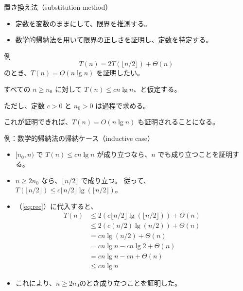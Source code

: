 \documentclass[unicode,11pt,aspectratio=169,notes]{beamer} %
\begin{document}
\begin{frame}{置き換え法（substitution method）}
  \begin{itemize}
    \item 定数を変数のままにして、限界を推測する。
    \item 数学的帰納法を用いて限界の正しさを証明し、定数を特定する。
  \end{itemize}
\end{frame}

\begin{frame}{例}
  \begin{equation}\label{eq:rec}
    T(n)=2T(\lfloor n/2\rfloor)+\Theta(n)
  \end{equation}
  のとき、$T(n)=O(n\lg n)$ を証明したい。

  \vspace{5mm}

  すべての $n\geq n_0$ に対して $T(n)\leq cn\lg n$、と仮定する。
  
  ただし、定数 $c>0$ と $n_0>0$ は過程で求める。

  \vspace{5mm}

  これが証明できれば、$T(n)=O(n\lg n)$ も証明されることになる。
\end{frame}

\begin{frame}{例：数学的帰納法の帰納ケース（inductive case）}
  \begin{itemize}
    \item<+-> $[n_0,n)$ で $T(n)\leq cn\lg n$ が成り立つなら、$n$
    でも成り立つことを証明する。
    \item<+-> $n\geq 2n_0$ なら、$\lfloor n/2\rfloor$ で成り立つ。
    従って、$T(\lfloor n/2\rfloor)\leq c\lfloor n/2\rfloor\lg(\lfloor n/2\rfloor)$。
    \item<+-> （\ref{eq:rec}）に代入すると、
    \begin{align*}
      T(n) & \leq 2(c\lfloor n/2\rfloor\lg(\lfloor n/2\rfloor)) + \Theta(n) \\
           & \leq 2(c(n/2)\lg(n/2)) + \Theta(n) \\
           & = cn\lg(n/2) + \Theta(n) \\
           & = cn\lg n - cn\lg 2 + \Theta(n) \\
           & = cn\lg n - cn + \Theta(n) \\
           & \leq cn\lg n
    \end{align*}
    \item<+-> これにより、$n\geq 2n_0$のとき成り立つことを証明した。
  \end{itemize}
\end{frame}
\end{document}
